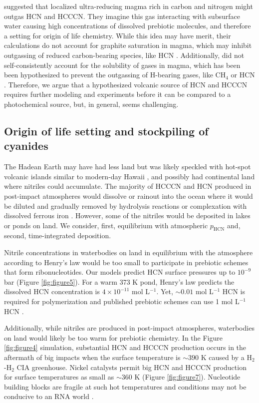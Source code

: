 \citet{Rimmer_2019b} suggested that localized ultra-reducing magma rich in carbon and nitrogen might outgas HCN and HCCCN. They imagine this gas interacting with subsurface water causing high concentrations of dissolved prebiotic molecules, and therefore a setting for origin of life chemistry. While this idea may have merit, their calculations do not account for graphite saturation in magma, which may inhibit outgassing of reduced carbon-bearing species, like HCN \citep{Hirschmann_2008,Wogan_2020,Thompson_2022}. Additionally, \citet{Rimmer_2019b} did not self-consistently account for the solubility of gases in magma, which has been been hypothesized to prevent the outgassing of H-bearing gases, like CH$_4$ or HCN \citep{Wogan_2020}. Therefore, we argue that a hypothesized volcanic source of HCN and HCCCN requires further modeling and experiments before it can be compared to a photochemical source, but, in general, seems challenging.

\subsection{Origin of life setting and stockpiling of cyanides}

The Hadean Earth may have had less land but was likely speckled with hot-spot volcanic islands similar to modern-day Hawaii \citep{Bada_2018}, and possibly had continental land \citep{Korenaga_2021} where nitriles could accumulate. The majority of HCCCN and HCN produced in post-impact atmospheres would dissolve or rainout into the ocean where it would be diluted and gradually removed by hydrolysis reactions \citep{Miyakawa_2002} or complexation with dissolved ferrous iron \citep{Keefe_1996}. However, some of the nitriles would be deposited in lakes or ponds on land. We consider, first, equilibrium with atmospheric $p_\mathrm{HCN}$ and, second, time-integrated deposition.

Nitrile concentrations in waterbodies on land in equilibrium with the atmosphere according to Henry's law would be too small to participate in prebiotic schemes that form ribonucleotides. Our models predict HCN surface pressures up to $10^{-9}$ bar (Figure \ref{fig:figure5}). For a warm 373 K pond, Henry's law predicts the dissolved HCN concentration is $4 \times 10^{-11}$ mol L$^{-1}$. Yet, $\sim 0.01$ mol L$^{-1}$ HCN is required for polymerization \citep{Sanchez_1967} and published prebiotic schemes can use 1 mol L$^{-1}$ HCN \citep{Patel_2015}.

Additionally, while nitriles are produced in post-impact atmospheres, waterbodies on land would likely be too warm for prebiotic chemistry. In the Figure \ref{fig:figure4} simulation, substantial HCN and HCCCN production occurs in the aftermath of big impacts when the surface temperature is $\sim 390$ K caused by a H$_2$-H$_2$ CIA greenhouse. Nickel catalysts permit big HCN and HCCCN production for surface temperatures as small as $\sim 360$ K (Figure \ref{fig:figure7}). Nucleotide building blocks are fragile at such hot temperatures and conditions may not be conducive to an RNA world \citep{Bada_2002}. 

